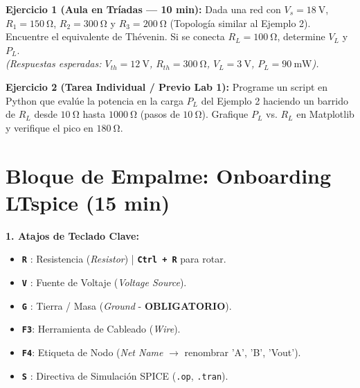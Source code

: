 \documentclass[11pt,a4paper]{article}
\newcommand{\tecla}[1]{\colorbox{gray!20}{\texttt{\footnotesize\textbf{#1}}}}
\begin{document}
\textbf{Ejercicio 1 (Aula en Tríadas — 10 min):} 
Dada una red con $V_s = \qty{18}{\volt}$, $R_1 = \qty{150}{\ohm}$, $R_2 = \qty{300}{\ohm}$ y $R_3 = \qty{200}{\ohm}$ (Topología similar al Ejemplo 2). Encuentre el equivalente de Thévenin. Si se conecta $R_L = \qty{100}{\ohm}$, determine $V_L$ y $P_L$. \\
\textit{(Respuestas esperadas: $V_{th} = \qty{12}{\volt}$, $R_{th} = \qty{300}{\ohm}$, $V_L = \qty{3}{\volt}$, $P_L = \qty{90}{\milli\watt}$).}

\vspace{0.2cm}
\textbf{Ejercicio 2 (Tarea Individual / Previo Lab 1):} 
Programe un script en Python que evalúe la potencia en la carga $P_L$ del Ejemplo 2 haciendo un barrido de $R_L$ desde $\qty{10}{\ohm}$ hasta $\qty{1000}{\ohm}$ (pasos de $\qty{10}{\ohm}$). Grafique $P_L$ vs. $R_L$ en Matplotlib y verifique el pico en $\qty{180}{\ohm}$.

\newpage

\section{Bloque de Empalme: Onboarding LTspice (15 min)}

\begin{tcolorbox}[caja_software={Guía Rápida de Comandos -- LTspice XVII / 24}]
\textbf{1. Atajos de Teclado Clave:}
\begin{itemize}[label=\raisebox{0.25ex}{\tiny$\bullet$}, itemsep=2pt]
    \item \tecla{R} : Resistencia (\textit{Resistor}) | \tecla{Ctrl + R} para rotar.
    \item \tecla{V} : Fuente de Voltaje (\textit{Voltage Source}).
    \item \tecla{G} : Tierra / Masa (\textit{Ground} - \textbf{OBLIGATORIO}).
    \item \tecla{F3}: Herramienta de Cableado (\textit{Wire}).
    \item \tecla{F4}: Etiqueta de Nodo (\textit{Net Name} $\rightarrow$ renombrar 'A', 'B', 'Vout').
    \item \tecla{S} : Directiva de Simulación SPICE (\texttt{.op}, \texttt{.tran}).
\end{itemize}
\end{tcolorbox}
\end{document}
